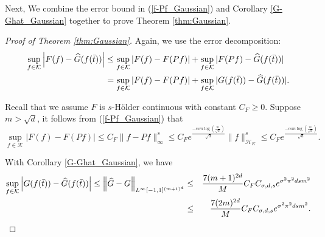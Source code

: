 \documentclass{article}
\numberwithin{equation}{section}
\begin{document}
\begin{appendices}
Next, We combine the error bound in (\ref{f-Pf_Gaussian}) and Corollary \ref{G-Ghat_Gaussian} together to prove Theorem \ref{thm:Gaussian}. 

\begin{proof}[Proof of Theorem \ref{thm:Gaussian}]
     Again, we use the error decomposition:
    \begin{eqnarray*}
         \sup_{f\in \mathcal{K}}\left| F(f) - \widehat{G}(f(\Bar{t}))\right| &\leq  \sup_{f\in \mathcal{K}}| F(f) - F(Pf)| +  \sup_{f\in \mathcal{K}}|F(Pf) - \widehat{G}(f(\Bar{t}))| \\
        &=  \sup_{f\in \mathcal{K}}| F(f) - F(Pf)| +  \sup_{f\in \mathcal{K}}|G(f(\Bar{t})) - \widehat{G}(f(\Bar{t}))|.
    \end{eqnarray*}

   Recall that we assume $F$ is  $s$-H\"{o}lder continuous with constant $C_F \geq 0$. Suppose $m > \sqrt{d}$, it follows from (\ref{f-Pf_Gaussian}) that
       \begin{equation*}
      \sup_{f\in \mathcal{K}}| F(f) - F(Pf)| \leq  C_F \|f-Pf\|^s_\infty \leq  C_F e^{\frac{-csm\log \left(\frac{m}{\sqrt{d}}\right)}{\sqrt{d}}}\|f\|^s_{\mathcal{H}_K} \leq C_F e^{\frac{-csm\log \left(\frac{m}{\sqrt{d}}\right)}{\sqrt{d}}}. 
   \end{equation*}
   
   With Corollary \ref{G-Ghat_Gaussian}, we have 
   \begin{eqnarray*}
       \sup_{f\in \mathcal{K}}\left|G(f(\Bar{t})) - \widehat{G}(f(\Bar{t}))\right| \leq \left\|\widehat{G}-G\right\|_{L^\infty [-1,1]^{(m+1)^{d}}}&\leq&\frac{7(m+1)^{2d}}{M} C_FC_{\sigma,d,s}e^{\sigma^2\pi^2 dsm^2}\\
       &\leq&\frac{7(2m)^{2d}}{M} C_FC_{\sigma,d,s}e^{\sigma^2\pi^2 dsm^2}.
   \end{eqnarray*}
   

\end{proof}
\end{appendices}
\end{document}
